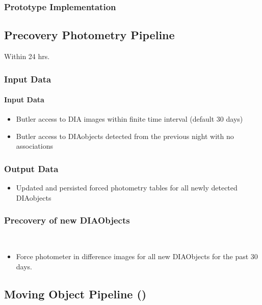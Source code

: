 \subsubsection{Prototype Implementation}

\clearpage

\subsection{Precovery Photometry Pipeline}

Within 24 hrs.

\subsubsection{Input Data}

\paragraph{Input Data}
\begin{itemize}
\item Butler access to DIA images within finite time interval (default 
  30 days) 
\item Butler access to DIAobjects detected from the previous night 
  with no associations 
\end{itemize}

\subsubsection{Output Data}
\begin{itemize}
\item Updated and persisted forced photometry tables for all newly
  detected DIAobjects
\end{itemize}


\subsubsection{Precovery of new DIAObjects}~

\begin{itemize}
\item Force photometer in difference images for all new DIAObjects for the past 30 days.
\end{itemize}
\clearpage

\subsection{Moving Object Pipeline (\wbsMOPS)}


